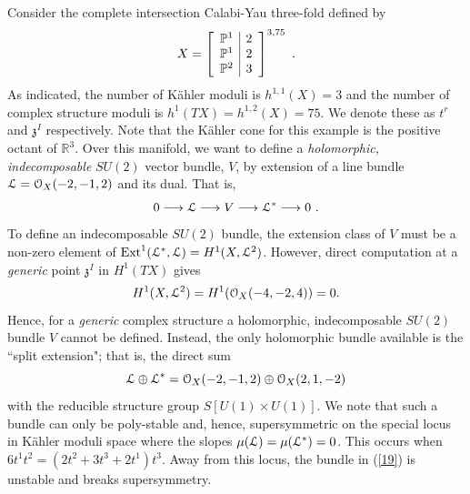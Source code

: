 \documentclass[12pt]{article}
\numberwithin{equation}{section}
\newcommand{\ba}{\begin{array}}
\newcommand{\ea}{\end{array}}
\begin{document}
Consider the complete intersection Calabi-Yau three-fold defined by
%
\begin{eqnarray}
\label{eg1cy3}
X=\left[ \ba{c |c }
\mathbb{P}^1 & 2 \\
\mathbb{P}^1 & 2 \\
\mathbb{P}^2 & 3
\ea \right]^{3,75} \ .
\end{eqnarray}
%
As indicated, the number of K\"ahler moduli is $h^{1,1}(X)=3$ and the number of complex structure moduli is $h^{1}(TX)=h^{1,2}(X)=75$. We denote these as $t^{r}$ and ${\mathfrak{z}}^{I}$ respectively. Note that the K\"ahler cone for this example is the positive octant of ${\mathbb{R}}^{3}$. Over this manifold, we want to define a {\it holomorphic,  indecomposable} $SU(2)$ vector bundle, $V$, by extension of a line bundle ${\cal{L}}={\cal{O}}_{X}(-2,-1,2)$ and its dual. That is,
%
\begin{equation}
0 \longrightarrow {\cal L} \longrightarrow V \longrightarrow {\cal L}^*\longrightarrow 0 \ .
\label{17}
\end{equation}
%
To define an indecomposable $SU(2)$ bundle, the extension class of $V$ must be a non-zero element of ${\rm Ext}^{1}({\cal{L}}^{*},{\cal{L}})=H^{1}(X,{\cal{L}}^{2})$. 
However, direct computation at a {\it generic} point ${\mathfrak{z}}^{I}$ in $H^{1}(TX)$ gives
%
\begin{equation}
H^{1}(X,{\cal{L}}^{2})=H^{1}({\cal{O}}_{X}(-4,-2,4))= 0. 
\label{18}
\end{equation}
%
Hence, for a {\it generic} complex structure a holomorphic, indecomposable 
$SU(2)$  bundle $V$ cannot be defined. Instead, the only holomorphic bundle available is the ``split extension"; that is, the direct sum
%
\begin{equation}
{\cal{L}} \oplus {\cal{L}}^{*}={\cal{O}}_{X}(-2,-1,2) \oplus  {\cal{O}}_{X}(2,1,-2) 
\label{19}
\end{equation}
with the reducible structure group $S[U(1) \times U(1)]$. 
We note that such a bundle can only be poly-stable and, hence, supersymmetric on the special locus in K\"ahler moduli space where the slopes $\mu({\cal{L}})=\mu({\cal{L}}^{*})=0$. This occurs when $6t^{1}t^{2}=(2t^{2}+3t^{3}+2t^{1})t^{3}$. Away from this locus, the bundle in (\ref{19}) is unstable and breaks supersymmetry. 
\end{document}
